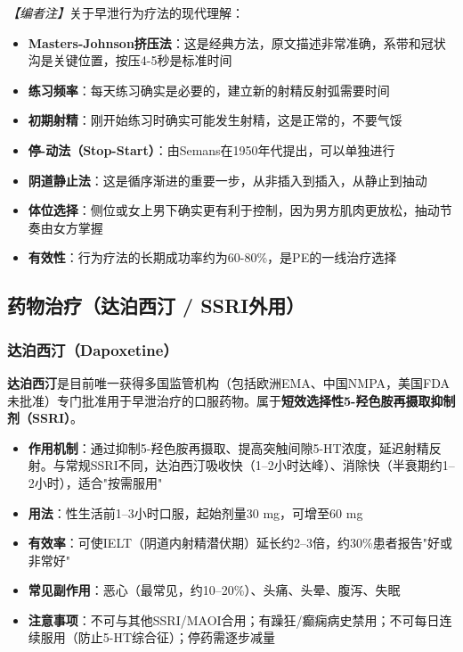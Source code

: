 \noindent\textit{【编者注】}关于早泄行为疗法的现代理解：
\begin{itemize}
	\item \textbf{Masters-Johnson挤压法}：这是经典方法，原文描述非常准确，系带和冠状沟是关键位置，按压4-5秒是标准时间
	\item \textbf{练习频率}：每天练习确实是必要的，建立新的射精反射弧需要时间
	\item \textbf{初期射精}：刚开始练习时确实可能发生射精，这是正常的，不要气馁
	\item \textbf{停-动法（Stop-Start）}：由Semans在1950年代提出，可以单独进行
	\item \textbf{阴道静止法}：这是循序渐进的重要一步，从非插入到插入，从静止到抽动
	\item \textbf{体位选择}：侧位或女上男下确实更有利于控制，因为男方肌肉更放松，抽动节奏由女方掌握
	\item \textbf{有效性}：行为疗法的长期成功率约为60-80\%，是PE的一线治疗选择
\end{itemize}

\subsection{药物治疗（达泊西汀 / SSRI外用）}

\subsubsection{达泊西汀（Dapoxetine）}

\textbf{达泊西汀}是目前唯一获得多国监管机构（包括欧洲EMA、中国NMPA，美国FDA未批准）专门批准用于早泄治疗的口服药物。属于\textbf{短效选择性5-羟色胺再摄取抑制剂（SSRI）}。

\begin{itemize}[leftmargin=2cm]
	\item \textbf{作用机制}：通过抑制5-羟色胺再摄取、提高突触间隙5-HT浓度，延迟射精反射。与常规SSRI不同，达泊西汀吸收快（1--2小时达峰）、消除快（半衰期约1--2小时），适合"按需服用"
	\item \textbf{用法}：性生活前1--3小时口服，起始剂量30 mg，可增至60 mg
	\item \textbf{有效率}：可使IELT（阴道内射精潜伏期）延长约2--3倍，约30\%患者报告"好或非常好"
	\item \textbf{常见副作用}：恶心（最常见，约10--20\%）、头痛、头晕、腹泻、失眠
	\item \textbf{注意事项}：不可与其他SSRI/MAOI合用；有躁狂/癫痫病史禁用；不可每日连续服用（防止5-HT综合征）；停药需逐步减量
\end{itemize}

